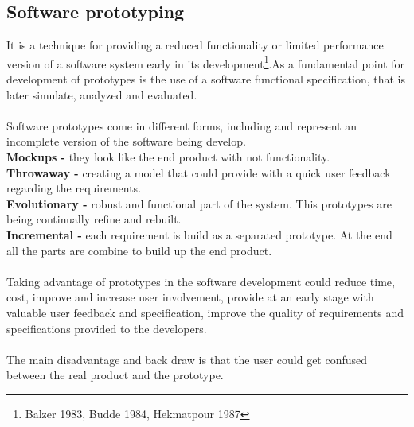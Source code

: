 \subsection{Software prototyping}
It is a technique for providing a reduced functionality or limited performance version of a software system early in its development\footnote{Balzer 1983, Budde 1984, Hekmatpour 1987}.As a fundamental point for development of prototypes is the use of a software functional specification, that is later simulate, analyzed and evaluated.\\ \\
Software prototypes come in different forms, including and represent an incomplete version of the software being develop.\\
{\bf Mockups -} they look like the end product with not functionality.\\
{\bf Throwaway -} creating a model that could provide with a quick user feedback regarding the requirements.\\
{\bf Evolutionary  -} robust and functional part of the system. This prototypes  are being continually refine and rebuilt.\\
{\bf Incremental  -} each requirement is build as a separated prototype. At the end all the parts are combine to build up the end product.\\
\\
Taking advantage of prototypes in the software development could reduce time, cost, improve and increase user involvement, provide at an early stage with valuable user feedback and specification, improve the quality of requirements and specifications provided to the developers.\\ \\
The main disadvantage and back draw is that the user could get confused between the real product and the prototype.\\
